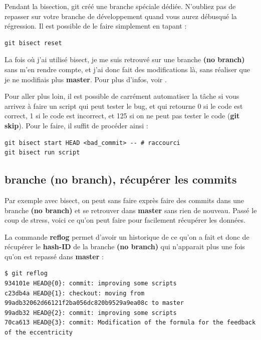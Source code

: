 \documentclass[a4paper,twoside]{article}
\begin{document}
\begin{attention}
Pendant la bisection, git créé une branche spéciale dédiée. N’oubliez pas de repasser sur votre branche de développement quand vous aurez débusqué la régression. Il est possible de le faire simplement en tapant :
\begin{verbatim}
git bisect reset
\end{verbatim}
\end{attention}



\begin{remarque}
La fois où j'ai utilisé bisect, je me suis retrouvé sur une branche \textbf{(no branch)} sans m'en rendre compte, et j'ai donc fait des modifications là, sans réaliser que je ne modifiais plus \textbf{master}. Pour plus d'infos, voir .
\end{remarque}



\bigskip

Pour aller plus loin, il est possible de carrément automatiser la tâche si vous arrivez à faire un script qui peut tester le bug, et qui retourne 0 si le code est correct, 1 si le code est incorrect, et 125 si on ne peut pas tester le code (\textbf{git skip}). Pour le faire, il suffit de procéder ainsi :
\begin{verbatim}
git bisect start HEAD <bad_commit> -- # raccourci
git bisect run script
\end{verbatim}

\subsection{branche (no branch), récupérer les commits}\label{sec:no-branch}
Par exemple avec bisect, on peut sans faire exprès faire des commits dans une branche \textbf{(no branch)} et se retrouver dans \textbf{master} sans rien de nouveau. Passé le coup de stress, voici ce qu'on peut faire pour facilement récupérer les données. 

La commande \textbf{reflog} permet d'avoir un historique de ce qu'on a fait et donc de récupérer le \textbf{hash-ID} de la branche \textbf{(no branch)} qui n'apparait plus une fois qu'on est repassé dans \textbf{master} : 
\begin{footnotesize}
\begin{verbatim}
$ git reflog
934101e HEAD@{0}: commit: improving some scripts
c23db4a HEAD@{1}: checkout: moving from 99adb32062d66121f2ba056dc820b9529a9ea08c to master
99adb32 HEAD@{2}: commit: improving some scripts
70ca613 HEAD@{3}: commit: Modification of the formula for the feedback of the eccentricity
\end{verbatim}
\end{footnotesize}
\end{document}

